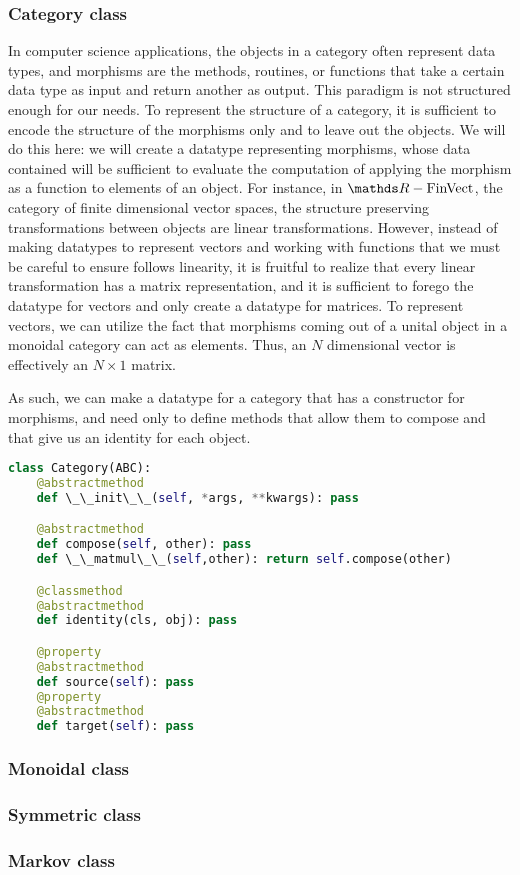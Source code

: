 \subsubsection{Category class}
In computer science applications, the objects in a category often represent data types, and morphisms are the methods, routines, or functions that take a certain data type as input and return another as output.
This paradigm is not structured enough for our needs.
To represent the structure of a category, it is sufficient to encode the structure of the morphisms only and to leave out the objects.
We will do this here: we will create a datatype representing morphisms, whose data contained will be sufficient to evaluate the computation of applying the morphism as a function to elements of an object.
For instance, in $\reals-\mathrm{FinVect}$, the category of finite dimensional vector spaces, the structure preserving transformations between objects are linear transformations.
However, instead of making datatypes to represent vectors and working with functions that we must be careful to ensure follows linearity, it is fruitful to realize that every linear transformation has a matrix representation, and it is sufficient to forego the datatype for vectors and only create a datatype for matrices.
To represent vectors, we can utilize the fact that morphisms coming out of a unital object in a monoidal category can act as elements.
Thus, an $N$ dimensional vector is effectively an $N\times 1$ matrix.

As such, we can make a datatype for a category that has a constructor for morphisms, and need only to define methods that allow them to compose and that give us an identity for each object.

\begin{lstlisting}[caption=category.py, language=Python, frame=single]
class Category(ABC):
    @abstractmethod
    def \_\_init\_\_(self, *args, **kwargs): pass

    @abstractmethod
    def compose(self, other): pass
    def \_\_matmul\_\_(self,other): return self.compose(other)

    @classmethod
    @abstractmethod
    def identity(cls, obj): pass

    @property
    @abstractmethod
    def source(self): pass
    @property
    @abstractmethod
    def target(self): pass
\end{lstlisting}

\subsubsection{Monoidal class}
\subsubsection{Symmetric class}
\subsubsection{Markov class}
